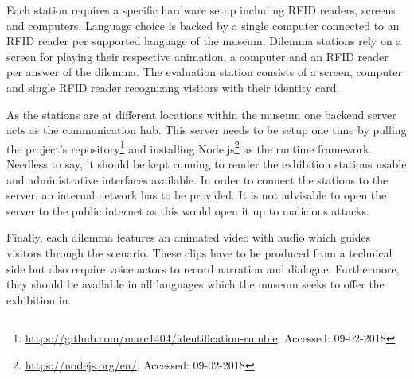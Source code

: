 Each station requires a specific hardware setup including RFID readers, screens and computers.
Language choice is backed by a single computer connected to an RFID reader per supported language of the museum.
Dilemma stations rely on a screen for playing their respective animation, a computer and an RFID reader per answer of the dilemma.
The evaluation station consists of a screen, computer and single RFID reader recognizing visitors with their identity card.

As the stations are at different locations within the museum one backend server acts as the communication hub.
This server needs to be setup one time by pulling the project's repository\footnote{\url{https://github.com/marc1404/identification-rumble}, Accessed: 09-02-2018} and installing Node.js\footnote{\url{https://nodejs.org/en/}, Accessed: 09-02-2018} as the runtime framework.
Needless to say, it should be kept running to render the exhibition stations usable and administrative interfaces available.
In order to connect the stations to the server, an internal network has to be provided.
It is not advisable to open the server to the public internet as this would open it up to malicious attacks.

Finally, each dilemma features an animated video with audio which guides visitors through the scenario.
These clips have to be produced from a technical side but also require voice actors to record narration and dialogue.
Furthermore, they should be available in all languages which the museum seeks to offer the exhibition in.

